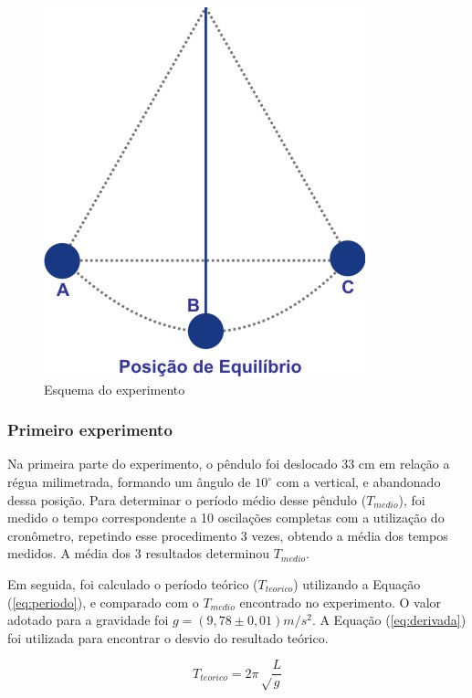 \documentclass[10pt]{article}
\begin{document}
\begin{figure}
	\begin{center}
		\includegraphics{desenho1-1.jpg}
		\caption{Esquema do experimento}
		\label{fig:pendulo}
	\end{center}

	
\end{figure}

\subsubsection{Primeiro experimento}
Na primeira parte do experimento, o pêndulo foi deslocado 33 cm em relação a régua milimetrada, formando um ângulo de $10^{\circ}$ com a vertical, e abandonado dessa posição. Para determinar o período médio desse pêndulo ($T_{medio}$), foi medido o tempo correspondente a 10 oscilações completas com a utilização do cronômetro, repetindo esse procedimento 3 vezes, obtendo a média dos tempos medidos. A média dos 3 resultados determinou $T_{medio}$.

Em seguida, foi calculado o período teórico ($T_{teorico}$) utilizando a Equação (\ref{eq:periodo}), e comparado com o $T_{medio}$ encontrado no experimento. O valor adotado para a gravidade foi $g = (9,78 \pm 0,01) m/s^2$. A Equação (\ref{eq:derivada}) foi utilizada para encontrar o desvio do resultado teórico. 

\begin{equation}
T_{teorico} = 2\pi\sqrt \frac{L}{g}
\label{eq:periodo}
\end{equation}
\end{document}
